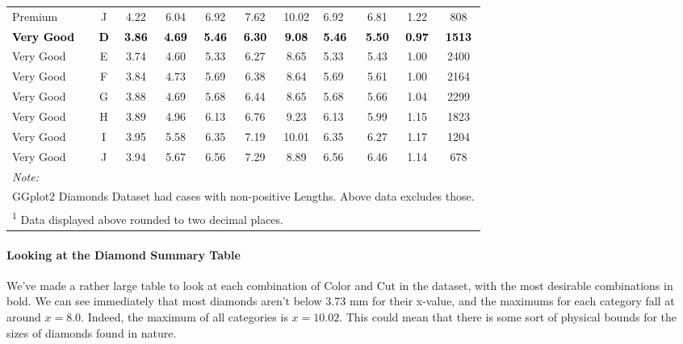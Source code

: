 \documentclass[
]{article}
\begin{document}
\begin{table}
{\begin{tabular}[t]{lcccccclccc}
Premium & J & 4.22 & 6.04 & 6.92 & 7.62 & 10.02 & 6.92 & 6.81 & 1.22 & 808\\
\textcolor{black}{\textbf{Very Good}} & \textcolor{black}{\textbf{D}} & \textcolor{black}{\textbf{3.86}} & \textcolor{black}{\textbf{4.69}} & \textcolor{black}{\textbf{5.46}} & \textcolor{black}{\textbf{6.30}} & \textcolor{black}{\textbf{9.08}} & \textcolor{black}{\textbf{5.46}} & \textcolor{black}{\textbf{5.50}} & \textcolor{black}{\textbf{0.97}} & \textcolor{black}{\textbf{1513}}\\
Very Good & E & 3.74 & 4.60 & 5.33 & 6.27 & 8.65 & 5.33 & 5.43 & 1.00 & 2400\\
\addlinespace
Very Good & F & 3.84 & 4.73 & 5.69 & 6.38 & 8.64 & 5.69 & 5.61 & 1.00 & 2164\\
Very Good & G & 3.88 & 4.69 & 5.68 & 6.44 & 8.65 & 5.68 & 5.66 & 1.04 & 2299\\
Very Good & H & 3.89 & 4.96 & 6.13 & 6.76 & 9.23 & 6.13 & 5.99 & 1.15 & 1823\\
Very Good & I & 3.95 & 5.58 & 6.35 & 7.19 & 10.01 & 6.35 & 6.27 & 1.17 & 1204\\
Very Good & J & 3.94 & 5.67 & 6.56 & 7.29 & 8.89 & 6.56 & 6.46 & 1.14 & 678\\
\bottomrule
\multicolumn{11}{l}{\rule{0pt}{1em}\textit{Note: }}\\
\multicolumn{11}{l}{\rule{0pt}{1em}GGplot2 Diamonds Dataset had cases with non-positive Lengths. Above data excludes those.}\\
\multicolumn{11}{l}{\rule{0pt}{1em}\textsuperscript{1} Data displayed above rounded to two decimal places.}\\
\end{tabular}}
\end{table}

\hypertarget{looking-at-the-diamond-summary-table}{%
\paragraph{Looking at the Diamond Summary
Table}\label{looking-at-the-diamond-summary-table}}

We've made a rather large table to look at each combination of Color and
Cut in the dataset, with the most desirable combinations in bold. We can
see immediately that most diamonds aren't below 3.73 mm for their
x-value, and the maximums for each category fall at around \(x = 8.0\).
Indeed, the maximum of all categories is \(x = 10.02\). This could mean
that there is some sort of physical bounds for the sizes of diamonds
found in nature.
\end{document}
